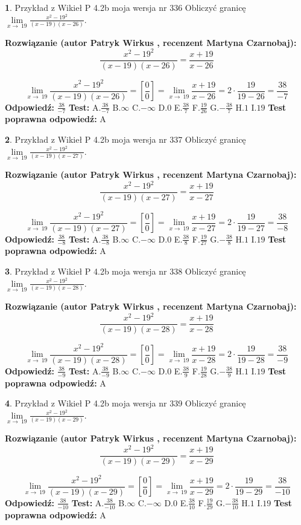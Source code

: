 \documentclass[12pt, a4paper]{article}
\theoremstyle{definition} %
\newtheorem{zad}{}
\newcommand{\zadStart}[1]{\begin{zad}#1\newline}
\newcommand{\zadStop}{\end{zad}}
\newcommand{\rozwStart}[2]{\noindent \textbf{Rozwiązanie (autor #1 , recenzent #2): }\newline}
\newcommand{\rozwStop}{\newline}
\newcommand{\odpStart}{\noindent \textbf{Odpowiedź:}\newline}
\newcommand{\odpStop}{\newline}
\newcommand{\testStart}{\noindent \textbf{Test:}\newline}
\newcommand{\testStop}{\newline}
\newcommand{\kluczStart}{\noindent \textbf{Test poprawna odpowiedź:}\newline}
\newcommand{\kluczStop}{\newline}
\begin{document}
\zadStart{Przykład z Wikieł P 4.2b moja wersja nr 336}
Obliczyć granicę $\lim\limits_{x\to\ 19}\frac{x^{2}-19^{2}}{(x-19)(x-26)}$.
\zadStop
\rozwStart{Patryk Wirkus}{Martyna Czarnobaj}
$$\frac{x^{2}-19^{2}}{(x-19)(x-26)}=\frac{x+19}{x-26}$$

$$\lim\limits_{x\to\ 19}\frac{x^{2}-19^{2}}{(x-19)(x-26)}=[\frac{0}{0}]=\lim\limits_{x\to\ 19}\frac{x+19}{x-26}=2 \cdot \frac{19}{19-26} = \frac{38}{-7}$$
\rozwStop
\odpStart
$\frac{38}{-7}$
\odpStop
\testStart
A.$\frac{38}{-7}$
B.$\infty$
C.$-\infty$
D.$0$
E.$\frac{38}{7}$
F.$\frac{19}{26}$
G.$-\frac{38}{7}$
H.$1$
I.$19$
\testStop
\kluczStart
A
\kluczStop



\zadStart{Przykład z Wikieł P 4.2b moja wersja nr 337}
Obliczyć granicę $\lim\limits_{x\to\ 19}\frac{x^{2}-19^{2}}{(x-19)(x-27)}$.
\zadStop
\rozwStart{Patryk Wirkus}{Martyna Czarnobaj}
$$\frac{x^{2}-19^{2}}{(x-19)(x-27)}=\frac{x+19}{x-27}$$

$$\lim\limits_{x\to\ 19}\frac{x^{2}-19^{2}}{(x-19)(x-27)}=[\frac{0}{0}]=\lim\limits_{x\to\ 19}\frac{x+19}{x-27}=2 \cdot \frac{19}{19-27} = \frac{38}{-8}$$
\rozwStop
\odpStart
$\frac{38}{-8}$
\odpStop
\testStart
A.$\frac{38}{-8}$
B.$\infty$
C.$-\infty$
D.$0$
E.$\frac{38}{8}$
F.$\frac{19}{27}$
G.$-\frac{38}{8}$
H.$1$
I.$19$
\testStop
\kluczStart
A
\kluczStop



\zadStart{Przykład z Wikieł P 4.2b moja wersja nr 338}
Obliczyć granicę $\lim\limits_{x\to\ 19}\frac{x^{2}-19^{2}}{(x-19)(x-28)}$.
\zadStop
\rozwStart{Patryk Wirkus}{Martyna Czarnobaj}
$$\frac{x^{2}-19^{2}}{(x-19)(x-28)}=\frac{x+19}{x-28}$$

$$\lim\limits_{x\to\ 19}\frac{x^{2}-19^{2}}{(x-19)(x-28)}=[\frac{0}{0}]=\lim\limits_{x\to\ 19}\frac{x+19}{x-28}=2 \cdot \frac{19}{19-28} = \frac{38}{-9}$$
\rozwStop
\odpStart
$\frac{38}{-9}$
\odpStop
\testStart
A.$\frac{38}{-9}$
B.$\infty$
C.$-\infty$
D.$0$
E.$\frac{38}{9}$
F.$\frac{19}{28}$
G.$-\frac{38}{9}$
H.$1$
I.$19$
\testStop
\kluczStart
A
\kluczStop



\zadStart{Przykład z Wikieł P 4.2b moja wersja nr 339}
Obliczyć granicę $\lim\limits_{x\to\ 19}\frac{x^{2}-19^{2}}{(x-19)(x-29)}$.
\zadStop
\rozwStart{Patryk Wirkus}{Martyna Czarnobaj}
$$\frac{x^{2}-19^{2}}{(x-19)(x-29)}=\frac{x+19}{x-29}$$

$$\lim\limits_{x\to\ 19}\frac{x^{2}-19^{2}}{(x-19)(x-29)}=[\frac{0}{0}]=\lim\limits_{x\to\ 19}\frac{x+19}{x-29}=2 \cdot \frac{19}{19-29} = \frac{38}{-10}$$
\rozwStop
\odpStart
$\frac{38}{-10}$
\odpStop
\testStart
A.$\frac{38}{-10}$
B.$\infty$
C.$-\infty$
D.$0$
E.$\frac{38}{10}$
F.$\frac{19}{29}$
G.$-\frac{38}{10}$
H.$1$
I.$19$
\testStop
\kluczStart
A
\kluczStop
\end{document}
